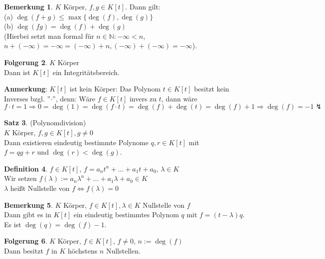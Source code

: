 \documentclass[10pt,a4paper,numbers=endperiod]{scrartcl}
\theoremstyle{definition}
\newtheorem{satz}{Satz}[section]
\newtheorem{defi}[satz]{Definition}
\newtheorem{bem}[satz]{Bemerkung}
\newtheorem{folg}[satz]{Folgerung}
\begin{document}
\begin{bem}
	$K$ Körper, $f,g \in K[t]$. Dann gilt: \\
	(a) $\deg(f+g) \leq \max\{\deg(f), \deg(g)\}$\\
	(b) $\deg(fg)= \deg(f)+ \deg(g)$\\
	(Hierbei setzt man formal für $n \in \mathbb{N}: -\infty < n$, $n+(-\infty)=-\infty = (-\infty) +n, (-\infty)+(-\infty)= -\infty$).
\end{bem}

\begin{folg}
	$K$ Körper\\
	Dann ist $K[t]$ ein Integritätsbereich.
\end{folg}

\textbf{Anmerkung}: $K[t]$ ist kein Körper: Das Polynom $t \in K[t]$ besitzt kein Inverses bzgl. ''$\cdot$'', denn: Wäre $f \in K[t]$ invers zu $t$, dann wäre $f \cdot t = 1 \Rightarrow 0 = \deg(1) = \deg(f \cdot t) = \deg(f) + \deg(t) = \deg(f) + 1 \Rightarrow \deg(f) = -1 \lightning$ 

\begin{satz}
	(Polynomdivision)\\
	$K$ Körper, $f,g \in K[t], g \neq 0$\\
	Dann existieren eindeutig bestimmte Polynome $q,r \in K[t]$ mit\\
	$ f = qg+r$ und $\deg(r) < \deg(g)$.
\end{satz}

\begin{defi}
	$f \in K[t]$, $f= a_nt^n+ \dots +a_1t+a_0$, $\lambda \in K$\\
	Wir setzen $f(\lambda) := a_n\lambda^n+ \dots +a_1\lambda+a_0 \in K$\\
	$\lambda$ heißt Nullstelle von $f \Leftrightarrow f(\lambda)=0$
\end{defi}

\begin{bem}
	$K$ Körper, $f \in K[t], \lambda \in K$ Nullstelle von $f$\\
	Dann gibt es in $K[t]$ ein eindeutig bestimmtes Polynom $q$ mit $f = (t-\lambda)q$.\\
	Es ist $\deg(q)= \deg(f)-1$.
\end{bem}

\begin{folg}
	$K$ Körper, $f \in K[t]$, $f \neq 0$, $n:= \deg(f)$\\
	Dann besitzt $f$ in $K$ höchstens $n$ Nullstellen. 
\end{folg}
\end{document}
